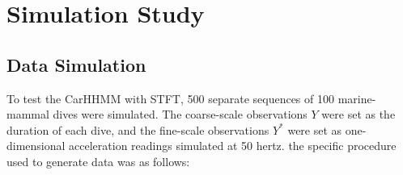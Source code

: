 
\section{Simulation Study}

\subsection{Data Simulation}


To test the CarHHMM with STFT, 500 separate sequences of 100 marine-mammal dives were simulated. The coarse-scale observations $Y$ were set as the duration of each dive, and the fine-scale observations $Y^*$ were set as one-dimensional acceleration readings simulated at 50 hertz. the specific procedure used to generate data was as follows: 

